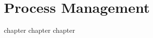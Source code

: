 
\part{Process Management}
{
    {chapter}
    {chapter}
    {chapter}
}

\cleardoublepage

\endinput
